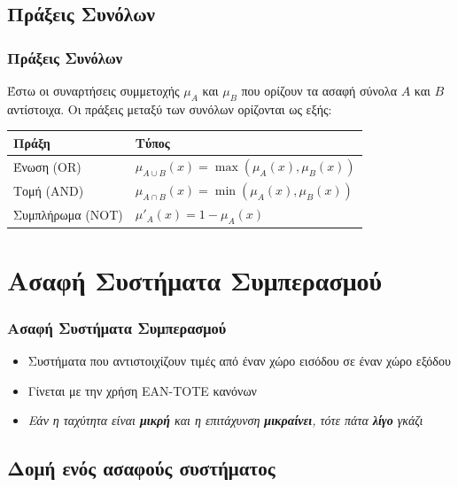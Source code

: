 \documentclass[xetex,serif,mathserif,14pt]{beamer}
\begin{document}
\subsection{Πράξεις Συνόλων}

\begin{frame}
\frametitle{Πράξεις Συνόλων}
Έστω οι συναρτήσεις συμμετοχής $\mu_A$ και $\mu_B$ που ορίζουν τα ασαφή σύνολα $A$ και $B$ αντίστοιχα. Οι πράξεις μεταξύ των συνόλων ορίζονται ως εξής:
\begin{table}[h]
\begin{small}
\begin{tabular}{@{}ll@{}}
    \toprule
    Πράξη             & Τύπος\\ \midrule
    Ένωση (OR)        & $\mu_{A \cup B}\left(x\right) = \max\left(\mu_{A}\left(x\right), \mu_{B}\left(x\right)\right)$ \\
    Τομή (AND)        & $\mu_{A \cap B}\left(x\right) = \min\left(\mu_{A}\left(x\right), \mu_{B}\left(x\right)\right)$ \\
    Συμπλήρωμα (NOT)  & $\mu'_{A}\left(x\right) = 1 - \mu_{A}\left(x\right)$ \\ \bottomrule
\end{tabular}
\end{small}
\end{table}
\end{frame}


\section{Ασαφή Συστήματα Συμπερασμού}

\begin{frame}
\frametitle{Ασαφή Συστήματα Συμπερασμού}
\begin{itemize}
  \item Συστήματα που αντιστοιχίζουν τιμές από έναν χώρο εισόδου σε έναν χώρο εξόδου\pause
  \item Γίνεται με την χρήση ΕΑΝ-ΤΟΤΕ κανόνων\pause
  \item \textit{Εάν η ταχύτητα είναι \textbf{μικρή} και η επιτάχυνση \textbf{μικραίνει}, τότε πάτα \textbf{λίγο} γκάζι}
\end{itemize}
\end{frame}

\subsection{Δομή ενός ασαφούς συστήματος}
\end{document}
